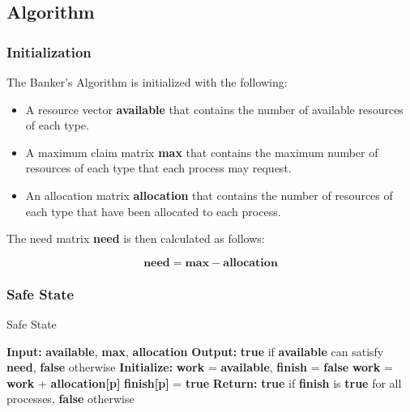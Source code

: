\subsection{Algorithm}

\subsubsection{Initialization}

The Banker's Algorithm is initialized with the following:

\begin{itemize}
	\item A resource vector \textbf{available} that contains the number of available resources of each type.
	\item A maximum claim matrix \textbf{max} that contains the maximum number of resources of each type that each process may request.
	\item An allocation matrix \textbf{allocation} that contains the number of resources of each type that have been allocated to each process.
\end{itemize}

The need matrix \textbf{need} is then calculated as follows:

\begin{equation}
	\textbf{need} = \textbf{max} - \textbf{allocation}
\end{equation}

\pagebreak

\subsubsection{Safe State}

\begin{algorithm}
	\caption{Safe State}
	\label{alg:safe_state}
	\begin{algorithmic}
		\State \textbf{Input:} \textbf{available}, \textbf{max}, \textbf{allocation}
		\State \textbf{Output:} \textbf{true} if \textbf{available} can satisfy \textbf{need}, \textbf{false} otherwise
		\State \textbf{Initialize:} \textbf{work} = \textbf{available}, \textbf{finish} = \textbf{false}
		\State \textbf{work} = \textbf{work} + \textbf{allocation[p]}
		\State \textbf{finish[p]} = \textbf{true}
		\EndIf
		\EndWhile
		\State \textbf{Return:} \textbf{true} if \textbf{finish} is \textbf{true} for all processes, \textbf{false} otherwise
	\end{algorithmic}
\end{algorithm}


